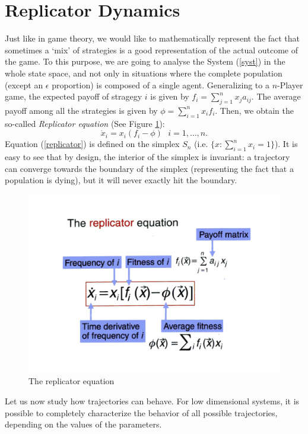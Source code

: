 \section{Replicator Dynamics}
Just like in game theory, we would like to mathematically represent the fact that sometimes a `mix' of strategies is a good representation of the actual outcome of the game.  To this purpose, we are going to analyse the System (\ref{syst}) in the whole state space, and not only in situations where the complete population (except an $\epsilon$  proportion) is composed of a single agent. Generalizing to a $n$-Player game, the expected payoff of stragegy $i$ is given by $f_i = \sum\limits_{j=1}^{n}x_j a_{ij}.$  The average payoff among all the strategies is given by $\phi = \sum\limits_{i=1}^{n}x_i f_i.$ Then, we obtain the so-called \emph{Replicator equation} (See Figure \ref{imrepli}):
\begin{equation}
\dot{x}_i = x_i (f_i - \phi)~~~i=1,\dots ,n. \label{replicator}
\end{equation}
Equation (\ref{replicator}) is defined on the simplex $S_n$ (i.e. $\{x: \sum\limits_{i=1}^{n} x_i =1\}$).  It is easy to see that by design, the interior of the simplex is invariant: a trajectory can converge towards the boundary of the simplex (representing the fact that a population is dying), but it will never exactly hit the boundary.
\begin{figure}[hbtp]
\centering
\includegraphics[scale=0.3]{im5.png}
\caption{The replicator equation}\label{imrepli}
\end{figure}
Let us now study how trajectories can behave.  For low dimensional systems, it is possible to completely characterize the behavior of all possible trajectories, depending on the values of the parameters.
